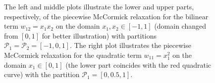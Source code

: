 \begin{figure}
\begin{subfigure}[b]{0.3\textwidth}


\end{subfigure}
\caption{
The left and middle plots illustrate the lower and upper parts, respectively, of the piecewise McCormick relaxation for the bilinear term \mbox{$w_{12} = x_1 x_2$} on the domain $x_1, x_2 \in [-1,1]$ (domain changed from $[0,1]$ for better illustration) with partitions \mbox{$\mathcal{P}_1 = \mathcal{P}_2 = [-1,0,1]$}.
The right plot illustrates the piecewise McCormick relaxation for the quadratic term $w_{11} = x^2_1$ on the domain $x_1 \in [0,1]$ (the lower part coincides with the red quadratic curve) with the partition $\mathcal{P}_1 = [0,0.5,1]$.
}
\label{fig:piecewise_mccormick}
\end{figure}